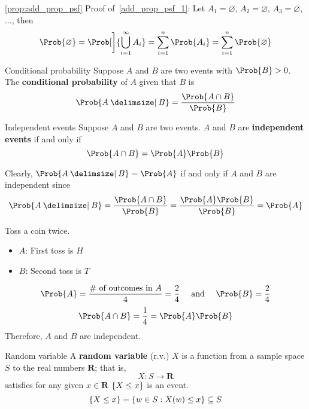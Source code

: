 \begin{Proof}{\ref{prop:add_prop_psf}}{}
    Proof of~\ref{add_prop_psf_1}: Let $ A_1=\varnothing $, $ A_2=\varnothing $,
    $ A_3=\varnothing $, $ \ldots $, then
    \[ \Prob{\varnothing}=
        \Prob[\bigg]{\bigcup_{i=1}^\infty A_i}=
        \sum_{i=1}^{n} \Prob{A_i}=\sum_{i=1}^{n}\Prob{\varnothing} \]

\end{Proof}
\begin{Definition}{Conditional probability}{}
    Suppose $ A $ and $ B $ are two events with
    $ \Prob{B}>0 $. The \textbf{conditional probability}
    of $ A $ given that $ B $ is
    \[ \Prob{A\given B}=\frac{\Prob{A\cap B}}{\Prob{B}} \]
\end{Definition}

\begin{Definition}{Independent events}{}
    Suppose $ A $ and $ B $ are two events. $ A $ and
    $ B $ are \textbf{independent events} if and only if
    \[ \Prob{A\cap B}=\Prob{A}\Prob{B} \]
\end{Definition}

Clearly, $ \Prob{A\given B}=\Prob{A} $ if and only if $ A $ and $ B $ are independent since
\[ \Prob{A\given B}=\frac{\Prob{A\cap B}}{\Prob{B}}=\frac{\Prob{A}\Prob{B}}{\Prob{B}}=\Prob{A}  \]

\begin{Example}{}{}
    Toss a coin twice.
    \begin{itemize}
        \item $ A $: First toss is $ H $
        \item $ B $: Second toss is $ T $
    \end{itemize}
    \[ \Prob{A}=\frac{\text{\# of outcomes in }A}{4}=\frac{2}{4}\quad
        \text{ and }\quad \Prob{B}=\frac{2}{4} \]
    \[ \Prob{A\cap B}=\frac{1}{4}=\Prob{A}\Prob{B} \]
    Therefore, $ A $ and $ B $ are independent.
\end{Example}

\begin{Definition}{Random variable}{}
    A \textbf{random variable} (r.v.) $ X $
    is a function from a sample space $ S $ to the real numbers $ \mathbf{R} $; that is,
    \[ X:S\to \mathbf{R} \] satisfies for any given $ x\in\mathbf{R} $
    $ \{X\le x\} $ is an event.
    \[ \{X\le x\}=\{w\in S:X(w)\le x\}
        \subseteq S \]
\end{Definition}

